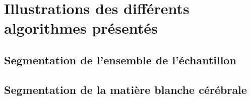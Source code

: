 \newcommand{\Figures}{../Figures}

\chapter{Illustrations des différents algorithmes présentés}

\section{
    \label{ann:whole}
    Segmentation de l'ensemble de l'échantillon
    }

\newpage

\section{
    \label{ann:white}
    Segmentation de la matière blanche cérébrale
    }

